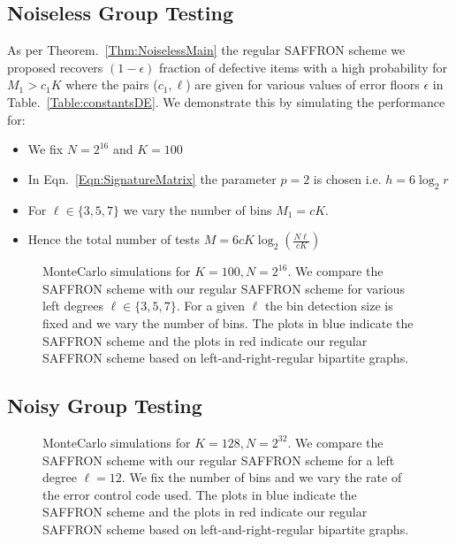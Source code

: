 \documentclass[conference,twocolumn]{IEEEtran}
\newcommand*{\MyPath}{../bib}
\begin{document}
\subsection{Noiseless Group Testing}
As per Theorem.~\ref{Thm:NoiselessMain} the regular SAFFRON scheme we proposed recovers $(1-\epsilon)$ fraction of defective items with a high probability for $M_1>c_1 K$ where the pairs ($c_1,\ell$) are given for various values of error floors $\epsilon$ in Table.~\ref{Table:constantsDE}. We demonstrate this by simulating the performance for:
\begin{itemize}
\item We fix $N=2^{16}$ and $K=100$
\item In Eqn.~\ref{Eqn:SignatureMatrix} the parameter $p=2$ is chosen i.e. $h=6\log_2 r$
\item For $\ell\in\{3,5,7\}$ we vary the number of bins $M_1=cK$. 
\item Hence the total number of tests $M=6cK\log_2 \left(\frac{N\ell}{cK}\right)$
\end{itemize} 
\begin{figure}[h]
\label{Fig:SimulationNoiseless}
\begin{center}
\resizebox{\columnwidth}{!}{}
\caption{MonteCarlo simulations for $K=100, N=2^{16}$. We compare the SAFFRON scheme with our regular SAFFRON scheme for various left degrees $\ell\in\{3,5,7\}$. For a given $\ell$ the bin detection size is fixed and we vary the number of bins. The plots in blue indicate the SAFFRON scheme and the plots in red indicate our regular SAFFRON scheme based on left-and-right-regular bipartite graphs.}
\end{center}
\end{figure}

\subsection{Noisy Group Testing}
\begin{figure}[h!]
\label{Fig:SimulationNoisy}
\begin{center}
\resizebox{\columnwidth}{!}{}
\caption{MonteCarlo simulations for $K=128, N=2^{32}$. We compare the SAFFRON scheme with our regular SAFFRON scheme for a left degree $\ell=12$. We fix the number of bins and we vary the rate of the error control code used. The plots in blue indicate the SAFFRON scheme and the plots in red indicate our regular SAFFRON scheme based on left-and-right-regular bipartite graphs.}
\end{center}
\end{figure}



\end{document}
